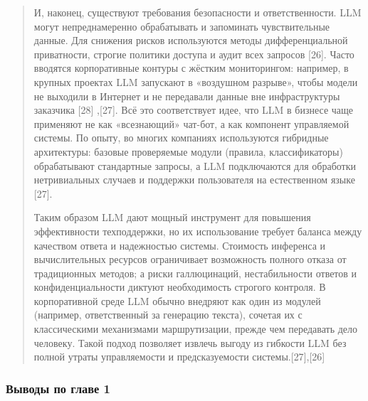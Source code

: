 \documentclass[
]{article}
\begin{document}
\begin{quote}
И, наконец, существуют требования безопасности и ответственности. LLM
могут непреднамеренно обрабатывать и запоминать чувствительные данные.
Для снижения рисков используются методы дифференциальной приватности,
строгие политики доступа и аудит всех запросов {[}26{]}. Часто вводятся
корпоративные контуры с жёстким мониторингом: например, в крупных
проектах LLM запускают в «воздушном разрыве», чтобы модели не выходили в
Интернет и не передавали данные вне инфраструктуры заказчика {[}28{]}
,{[}27{]}. Всё это соответствует идее, что LLM в бизнесе чаще применяют
не как «всезнающий» чат-бот, а как компонент управляемой системы. По
опыту, во многих компаниях используются гибридные архитектуры: базовые
проверяемые модули (правила, классификаторы) обрабатывают стандартные
запросы, а LLM подключаются для обработки нетривиальных случаев и
поддержки пользователя на естественном языке {[}27{]}.

Таким образом LLM дают мощный инструмент для повышения эффективности
техподдержки, но их использование требует баланса между качеством ответа
и надежностью системы. Стоимость инференса и вычислительных ресурсов
ограничивает возможность полного отказа от традиционных методов; а риски
галлюцинаций, нестабильности ответов и конфиденциальности диктуют
необходимость строгого контроля. В корпоративной среде LLM обычно
внедряют как один из модулей (например, ответственный за генерацию
текста), сочетая их с классическими механизмами маршрутизации, прежде
чем передавать дело человеку. Такой подход позволяет извлечь выгоду из
гибкости LLM без полной утраты управляемости и предсказуемости
системы.{[}27{]},{[}26{]}
\end{quote}

\hypertarget{ux432ux44bux432ux43eux434ux44b-ux43fux43e-ux433ux43bux430ux432ux435-1}{%
\subsubsection{Выводы по главе
1}\label{ux432ux44bux432ux43eux434ux44b-ux43fux43e-ux433ux43bux430ux432ux435-1}}
\end{document}
